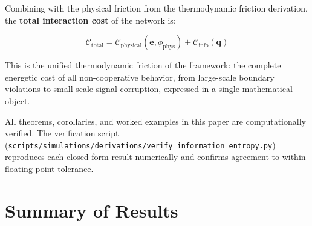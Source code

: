 \documentclass[11pt]{article}
\theoremstyle{plain}
\theoremstyle{definition}
\theoremstyle{remark}
\let\origsection\section
\renewcommand{\section}{\needspace{12\baselineskip}\origsection}
\begin{document}
Combining with the physical friction from the thermodynamic friction
derivation, the \textbf{total interaction cost} of the network is:

\[\mathcal{C}_{\text{total}} = \mathcal{C}_{\text{physical}}(\mathbf{e}, \phi_{\text{phys}}) + \mathcal{C}_{\text{info}}(\mathbf{q})\]

This is the unified thermodynamic friction of the framework: the
complete energetic cost of all non-cooperative behavior, from
large-scale boundary violations to small-scale signal corruption,
expressed in a single mathematical object.

All theorems, corollaries, and worked examples in this paper are
computationally verified. The verification script
(\texttt{scripts/simulations/derivations/verify\_information\_entropy.py})
reproduces each closed-form result numerically and confirms agreement to
within floating-point tolerance.

\section{Summary of Results}\label{summary-of-results}
\end{document}
